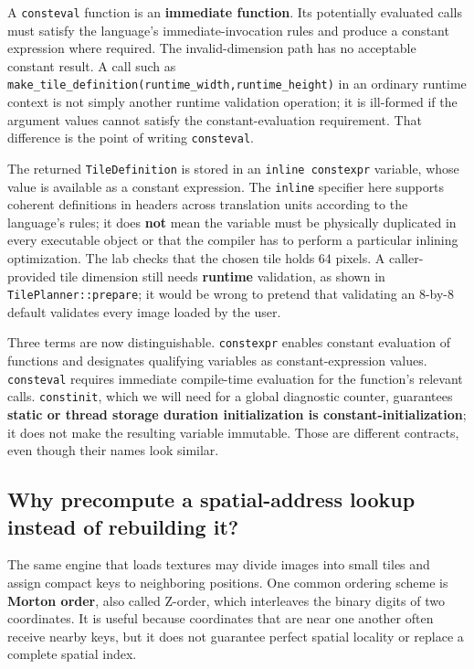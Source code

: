 A \texttt{consteval} function is an \textbf{immediate function}. Its potentially evaluated calls must satisfy the language's immediate-invocation rules and produce a constant expression where required. The invalid-dimension path has no acceptable constant result. A call such as \texttt{make\_tile\_definition(runtime\_width,runtime\_height)} in an ordinary runtime context is not simply another runtime validation operation; it is ill-formed if the argument values cannot satisfy the constant-evaluation requirement. That difference is the point of writing \texttt{consteval}.

The returned \texttt{TileDefinition} is stored in an \texttt{inline\ constexpr} variable, whose value is available as a constant expression. The \texttt{inline} specifier here supports coherent definitions in headers across translation units according to the language's rules; it does \textbf{not} mean the variable must be physically duplicated in every executable object or that the compiler has to perform a particular inlining optimization. The lab checks that the chosen tile holds 64 pixels. A caller-provided tile dimension still needs \textbf{runtime} validation, as shown in \texttt{TilePlanner::prepare}; it would be wrong to pretend that validating an 8-by-8 default validates every image loaded by the user.

Three terms are now distinguishable. \texttt{constexpr} enables constant evaluation of functions and designates qualifying variables as constant-expression values. \texttt{consteval} requires immediate compile-time evaluation for the function's relevant calls. \texttt{constinit}, which we will need for a global diagnostic counter, guarantees \textbf{static or thread storage duration initialization is constant-initialization}; it does not make the resulting variable immutable. Those are different contracts, even though their names look similar.

\subsection{Why precompute a spatial-address lookup instead of rebuilding it?}\label{05-engine-i-ch005-why-precompute-a-spatial-address-lookup-instead-of-rebuilding-it}

The same engine that loads textures may divide images into small tiles and assign compact keys to neighboring positions. One common ordering scheme is \textbf{Morton order}, also called Z-order, which interleaves the binary digits of two coordinates. It is useful because coordinates that are near one another often receive nearby keys, but it does not guarantee perfect spatial locality or replace a complete spatial index.


